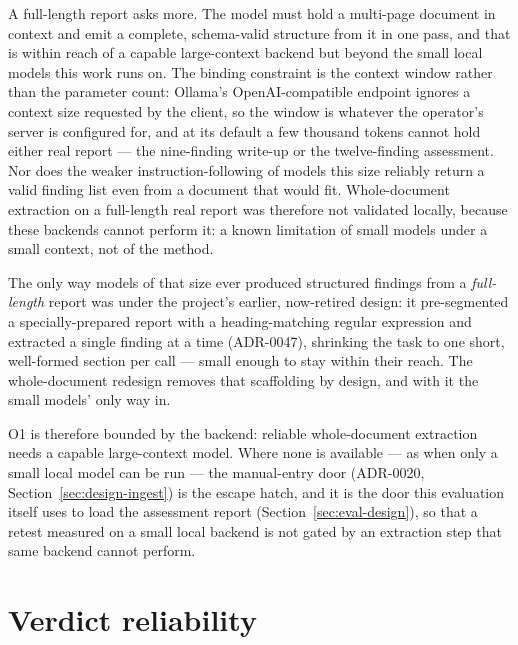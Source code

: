A full-length report asks more. The model must hold a multi-page document in context
and emit a complete, schema-valid structure from it in one pass, and that is within
reach of a capable large-context backend but beyond the small local models this work
runs on. The binding constraint is the context window rather than the parameter count:
Ollama's OpenAI-compatible endpoint ignores a context size requested by the client, so
the window is whatever the operator's server is configured for, and at its default a
few thousand tokens cannot hold either real report --- the nine-finding write-up
\cite{mthimunye_juiceshop} or the twelve-finding assessment. Nor does the weaker
instruction-following of models this size reliably return a valid finding list even
from a document that would fit. Whole-document extraction on a full-length real report
was therefore not validated locally, because these backends cannot perform it: a known
limitation of small models under a small context, not of the method.

The only way models of that size ever produced structured findings from a
\emph{full-length} report was under the
project's earlier, now-retired design: it pre-segmented a specially-prepared report with
a heading-matching regular expression and extracted a single finding at a time
(ADR-0047), shrinking the task to one short, well-formed section per call --- small
enough to stay within their reach. The whole-document redesign removes that scaffolding
by design, and with it the small models' only way in.

O1 is therefore bounded by the backend: reliable whole-document extraction needs a
capable large-context model. Where none is available --- as when only a small local
model can be run --- the manual-entry door (ADR-0020, Section~\ref{sec:design-ingest})
is the escape hatch, and it is the door this evaluation itself uses to load the
assessment report (Section~\ref{sec:eval-design}), so that a retest measured on a small
local backend is not gated by an extraction step that same backend cannot perform.

\section{Verdict reliability}
\label{sec:eval-verdicts}

